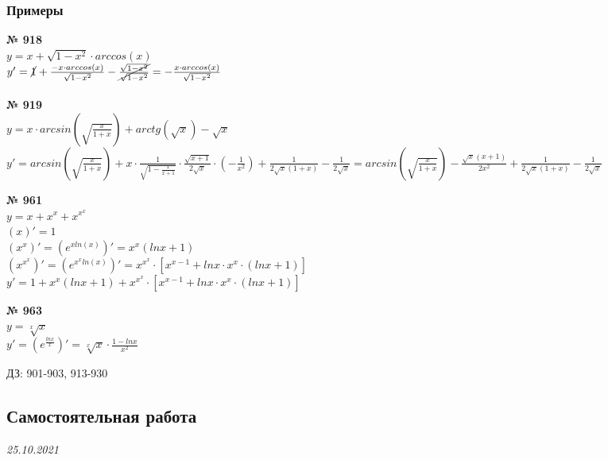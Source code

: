 \documentclass[12pt]{article}
\begin{document}
{\subsubsection{Примеры}

\vspace{.5cm}
{
	{\textbf{№ 918} \vspace{.5cm}\\}
	\large{ $y = x + \sqrt{1-x^2} \cdot arccos(x)$\\
		$y'=\cancel{1} + \frac{-x \cdot arccos(x)}{\sqrt{1-x^2}} - \cancel{\frac{\sqrt{1-x^2}}{\sqrt{1-x^2}}} = -\frac{x \cdot arccos(x)}{\sqrt{1-x^2}}
		$\\
	}
}
\vspace{.5cm}\\
{
	{\textbf{№ 919} \vspace{.5cm}\\}
	\large{ $y = x \cdot arcsin(\sqrt{\frac{x}{1+x}}) + arctg(\sqrt{x})-\sqrt{x}$\\
		$y'=arcsin(\sqrt{\frac{x}{1+x}}) + x\cdot \frac{1}{\sqrt{1-\frac{x}{x+1}}} \cdot \frac{\sqrt{x+1}}{2\sqrt{x}} \cdot (-\frac{1}{x^2}) + \frac{1}{2\sqrt{x}(1+x)}-\frac{1}{2\sqrt{x}} = arcsin(\sqrt{\frac{x}{1+x}}) - \frac{\sqrt{x}(x+1)}{2x^2}+\frac{1}{2\sqrt{x}(1+x)}-\frac{1}{2\sqrt{x}}$
	}
}

\vspace{.5cm}
{
	{\textbf{№ 961} \vspace{.5cm}\\}
	\large{ $y=x+x^x+x^{x^x}$\\
		$(x)'=1$\\
		$(x^x)'=(e^{xln(x)})'=x^x(lnx+1)$\\
		$(x^{x^x})'=(e^{x^xln(x)})'=x^{x^x}\cdot[x^{x-1}+lnx\cdot x^x \cdot (lnx+1)]$\\
		$y'=1+x^x(lnx+1)+x^{x^x}\cdot[x^{x-1}+lnx\cdot x^x \cdot (lnx+1)]$
	}
}

\vspace{.5cm}
{
	{\textbf{№ 963} \vspace{.5cm}\\}
	\large{ $y=\sqrt[x]{x}$\\
		$y'=(e^{\frac{lnx}{x}})'=\sqrt[x]{x} \cdot \frac{1-lnx}{x^2}$
	}
}


\vspace{2cm}
ДЗ: 901-903, 913-930

\vspace{2cm}

\subsection{Самостоятельная работа}
{\hfill \textit{25.10.2021}\\}

}
\end{document}
